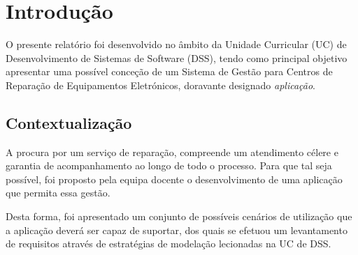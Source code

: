 \documentclass[a4paper,12pt]{scrreprt}
\begin{document}
\pagebreak



\renewcommand{\contentsname}{Índice}

\tableofcontents

\pagebreak

\listoffigures

\pagebreak

\listoftables

\pagebreak





\chapter{Introdução}
O presente relatório foi desenvolvido no âmbito da Unidade Curricular (UC) de Desenvolvimento de Sistemas de Software (DSS),
tendo como principal objetivo apresentar uma possível conceção de um Sistema de Gestão para Centros de Reparação de Equipamentos Eletrónicos, doravante designado \textit{aplicação}.

\section{Contextualização}
A procura por um serviço de reparação, compreende um atendimento célere e garantia de acompanhamento ao longo de todo o processo.
Para que tal seja possível, foi proposto pela equipa docente o desenvolvimento de uma aplicação que permita essa gestão.

Desta forma, foi apresentado um conjunto de possíveis cenários de utilização que a aplicação deverá ser capaz de suportar,
dos quais se efetuou um levantamento de requisitos através de estratégias de modelação lecionadas na UC de DSS.
\end{document}
